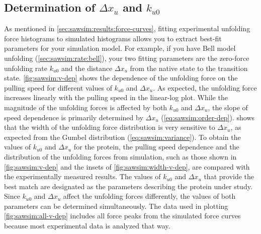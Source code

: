 \subsection{Determination of $\Delta x_u$ and $k_{u0}$}
\label{sec:sawsim:results:fitting}

As mentioned in \cref{sec:sawsim:results:force-curves}, fitting
experimental unfolding force histograms to simulated histograms allows
you to extract best-fit parameters for your simulation model.  For
example, if you have Bell model unfolding
(\cref{sec:sawsim:rate:bell}), your two fitting parameters are the
zero-force unfolding rate $k_{u0}$ and the distance $\Delta x_u$ from
the native state to the transition state.  \cref{fig:sawsim:v-dep}
shows the dependence of the unfolding force on the pulling speed for
different values of $k_{u0}$ and $\Delta x_u$.  As expected, the
unfolding force increases linearly with the pulling speed in the
linear-log plot\citep{evans99}.  While the magnitude of the unfolding
forces is affected by both $k_{u0}$ and $\Delta x_u$, the slope of
speed dependence is primarily determined by $\Delta x_u$
(\cref{eq:sawsim:order-dep}).   shows
that the width of the unfolding force distribution is very sensitive
to $\Delta x_u$, as expected from the Gumbel distribution
(\cref{eq:sawsim:variance}).  To obtain the values of $k_{u0}$ and
$\Delta x_u$ for the protein, the pulling speed dependence and the
distribution of the unfolding forces from simulation, such as those
shown in \cref{fig:sawsim:v-dep} and the insets of
\cref{fig:sawsim:width-v-dep}, are compared with the experimentally
measured results.  The values of $k_{u0}$ and $\Delta x_u$ that
provide the best match are designated as the parameters describing the
protein under study.  Since $k_{u0}$ and $\Delta x_u$ affect the
unfolding forces differently, the values of both parameters can be
determined simultaneously.  The data used in plotting
\cref{fig:sawsim:all-v-dep} includes all force peaks from the
simulated force curves because most experimental data is analyzed that
way.  %

